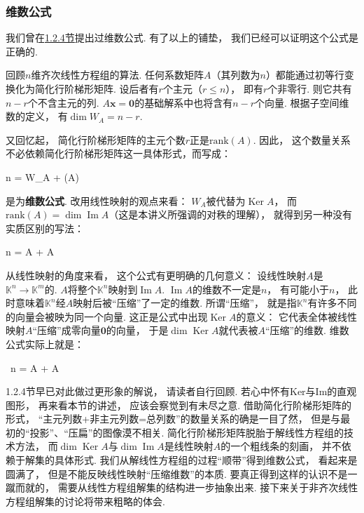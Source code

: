 \subsubsection{维数公式}


我们曾在\hyperlink{ker}{1.2.4节}提出过维数公式.
有了以上的铺垫，
我们已经可以证明这个公式是正确的.

回顾$n$维齐次线性方程组的算法.
任何系数矩阵$A$（其列数为$n$）都能通过初等行变换化为简化行阶梯形矩阵.
设后者有$r$个主元（$r \le n$），
即有$r$个非零行.
则它共有$n - r$个不含主元的列.
$A \bm{x} = \bm{0}$的基础解系中也将含有$n-r$个向量.
根据子空间维数的定义，
有$\dim W_A = n-r$.

又回忆起，
简化行阶梯形矩阵的主元个数$r$正是$\text{rank}(A)$.
因此，
这个数量关系不必依赖简化行阶梯形矩阵这一具体形式，而写成：
\begin{eq1}
     n = \dim W_A + (A) \end{eq1}
是为\textbf{维数公式}.
改用线性映射的观点来看：
$W_A$被代替为$\operatorname{Ker}A$，
而$\text{rank}(A) = \dim\operatorname{Im}A$（这是本讲义所强调的对秩的理解），
就得到另一种没有实质区别的写法：
\begin{eq1}
    n = \dim  {} A  + \dim  {} A \end{eq1}

从线性映射的角度来看，
这个公式有更明确的几何意义：
设线性映射$A$是$\mathbb{K}^n \to \mathbb{K}^m$的.
$A$将整个$\mathbb{K}^n$映射到$\operatorname{Im}A$.
$\operatorname{Im}A$的维数不一定是$n$，
有可能小于$n$，
此时意味着$\mathbb{K}^n$经$A$映射后被“压缩”了一定的维数.
所谓“压缩”，
就是指$\mathbb{K}^n$有许多不同的向量会被映为同一个向量.
这正是公式中出现$\operatorname{Ker}A$的意义：
它代表全体被线性映射$A$“压缩”成零向量$\bm{0}$的向量，
于是$\dim\operatorname{Ker}A$就代表被$A$“压缩”的维数.
维数公式实际上就是：
\begin{eq1}
    ~n
    = 
    A
    +
    A
    \end{eq1}

1.2.4节早已对此做过更形象的解说，
请读者自行回顾.
若心中怀有Ker与Im的直观图形，
再来看本节的讲述，
应该会察觉到有未尽之意.
借助简化行阶梯形矩阵的形式，
“主元列数+非主元列数=总列数”的数量关系的确是一目了然，
但是与最初的“投影”、“压扁”的图像漠不相关.
简化行阶梯形矩阵脱胎于解线性方程组的技术方法，
而$\dim\operatorname{Ker}A$与$\dim\operatorname{Im}A$是线性映射$A$的一个粗线条的刻画，
并不依赖于解集的具体形式.
我们从解线性方程组的过程“顺带”得到维数公式，
看起来是圆满了，
但是不能反映线性映射“压缩维数”的本质.
要真正得到这样的认识不是一蹴而就的，
需要从线性方程组解集的结构进一步抽象出来.
接下来关于非齐次线性方程组解集的讨论将带来粗略的体会.


